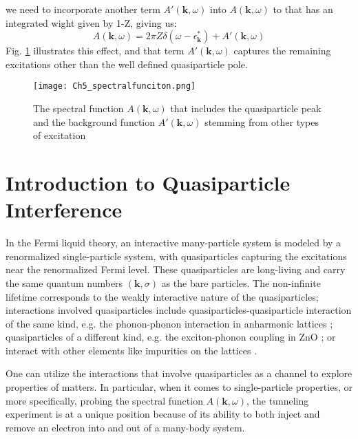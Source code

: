 we need to incorporate another term $A'(\textbf{k},\omega)$ into $ A(\textbf{k},\omega)$ to that has an integrated wight given by 1-Z, giving us: 
\begin{equation}
	\label{eq.akw}
	A(\textbf{k},\omega) = 2\pi Z\delta(\omega-\epsilon^*_\textbf{k}) + A'(\textbf{k},\omega)
\end{equation}
Fig. \ref{fig:ch5_spect} \cite{bruusManyBodyQuantum2004} illustrates this effect, and that term $A'(\textbf{k},\omega)$ captures the remaining excitations other than the well defined quasiparticle pole. 

\begin{figure}
	\centering
	\texttt{[image: Ch5\_spectralfunciton.png]}
	\caption{The spectral function $A(\textbf{k},\omega)$ that includes the quasiparticle peak and the background function $A'(\textbf{k},\omega)$ stemming from other types of excitation}
	\label{fig:ch5_spect}
\end{figure}

\section{Introduction to Quasiparticle Interference}

In the Fermi liquid theory, an interactive many-particle system is modeled by a renormalized single-particle system, with quasiparticles capturing the excitations near the renormalized Fermi level. These quasiparticles are long-living and carry the same quantum numbers $(\textbf{k}, \sigma)$ as the bare particles. The non-infinite lifetime corresponds to the weakly interactive nature of the quasiparticles; interactions involved quasiparticles include quasiparticles-quasiparticle interaction of the same kind, e.g. the phonon-phonon interaction in anharmonic lattices \cite{kimExploringAnharmonicLattice2023}; quasiparticles of a different kind, e.g. the exciton-phonon coupling in ZnO \cite{mendelsbergPhotoluminescenceExcitonphononCoupling2011}; or interact with other elements like impurities on the lattices \cite{avrahamQuasiparticleInterferenceStudies2018}. 

One can utilize the interactions that involve quasiparticles as a channel to explore properties of matters. In particular, when it comes to single-particle properties, or more specifically, probing the spectral function $A(\textbf{k},\omega)$, the tunneling experiment is at a unique position because of its ability to both inject and remove an electron into and out of a many-body system.  


